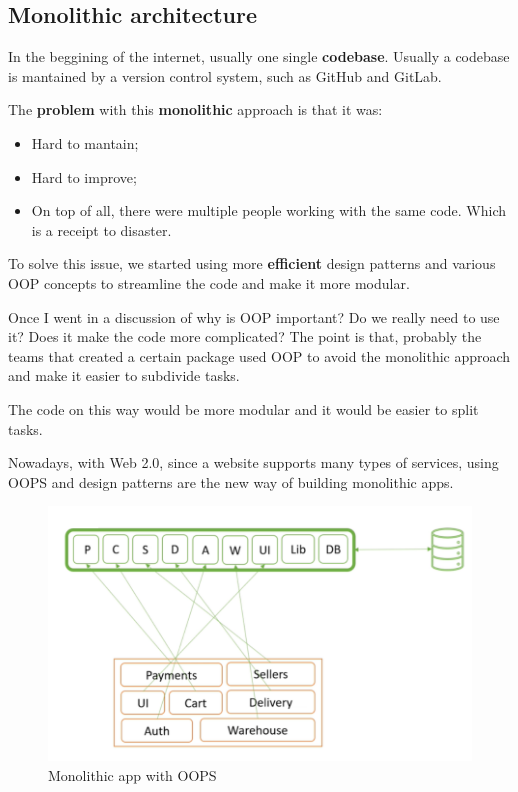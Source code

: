 \subsection{Monolithic architecture}
In the beggining of the internet, usually one single \textbf{codebase}. Usually a codebase 
is mantained by a version control system, such as GitHub and GitLab. 

The \textbf{problem} with this \textbf{monolithic} approach is that it was:
\begin{itemize}
    \item Hard to mantain; 
    \item Hard to improve;
    \item On top of all, there were multiple people working with the same code. 
    Which is a receipt to disaster.  
\end{itemize}

To solve this issue, we started using more \textbf{efficient} design patterns and 
various OOP concepts to streamline the code and make it more modular. 

\begin{tcolorbox}
    Once I went in a discussion of why is OOP important? Do we really need to use it? 
    Does it make the code more complicated? The point is that, probably the teams that 
    created a certain package used OOP to avoid the monolithic approach and make it easier
    to subdivide tasks. 

    The code on this way would be more modular and it would be easier to split tasks. 
\end{tcolorbox}

Nowadays, with Web 2.0, since a website supports many types of services, using OOPS
and design patterns are the new way of building monolithic apps. 

\begin{figure}[h]
\centering
\includegraphics[width=0.7\linewidth]{figures/01_basics/monolithics_apps_oops.png}
\caption{Monolithic app with OOPS}
\label{fig:monolithic_app}
\end{figure}

